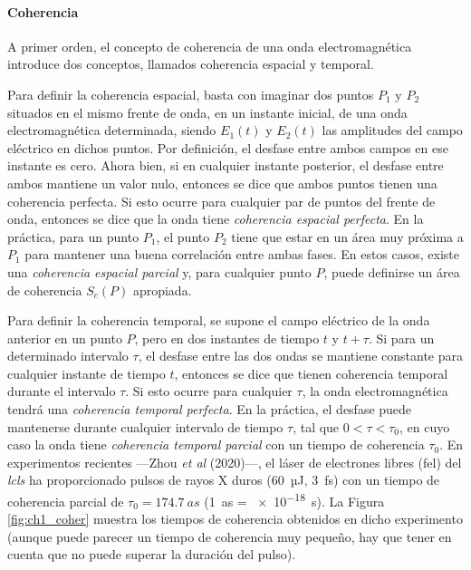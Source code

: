 \paragraph{Coherencia}\label{par:1.1.2.2}
A primer orden, el concepto de coherencia de una onda electromagnética introduce dos conceptos, llamados coherencia espacial y temporal\autocite{Svelto2010}.

Para definir la coherencia espacial, basta con imaginar dos puntos $P_1$ y $P_2$ situados en el mismo frente de onda, en un instante inicial, de una onda electromagnética determinada, siendo $E_1(t)$ y $E_2(t)$ las amplitudes del campo eléctrico en dichos puntos. Por definición, el desfase entre ambos campos en ese instante es cero. Ahora bien, si en cualquier instante posterior, el desfase entre ambos mantiene un valor nulo, entonces se dice que ambos puntos tienen una coherencia perfecta. Si esto ocurre para cualquier par de puntos del frente de onda, entonces se dice que la onda tiene \emph{coherencia espacial perfecta}. En la práctica, para un punto $P_1$, el punto $P_2$ tiene que estar en un área muy próxima a $P_1$ para mantener una buena correlación entre ambas fases. En estos casos, existe una \emph{coherencia espacial parcial} y, para cualquier punto $P$, puede definirse un área de coherencia $S_{c}(P)$ apropiada.

Para definir la coherencia temporal, se supone el campo eléctrico de la onda anterior en un punto $P$, pero en dos instantes de tiempo $t$ y $t+\tau$. Si para un determinado intervalo $\tau$, el desfase entre las dos ondas se mantiene constante para cualquier instante de tiempo $t$, entonces se dice que tienen coherencia temporal durante el intervalo $\tau$. Si esto ocurre para cualquier $\tau$, la onda electromagnética tendrá una \emph{coherencia temporal perfecta}. En la práctica, el desfase puede mantenerse durante cualquier intervalo de tiempo $\tau$, tal que $0<\tau<\tau_0$, en cuyo caso la onda tiene \emph{coherencia temporal parcial} con un tiempo de coherencia $\tau_0$. En experimentos recientes ---Zhou \emph{et al} (2020)---\autocite{Zhou2020}, el láser de electrones libres (\acrshort{fel}) del \emph{\acrfull{lcls}} ha proporcionado pulsos de rayos X duros (\qty{60}{µJ}, \qty{3}{fs}) con un tiempo de coherencia parcial de $\tau_0 = \qty{174,7}{as}$ (\qty{1}{as} = \qty{e-18}{s}). La Figura \ref{fig:ch1_coher} muestra los tiempos de coherencia obtenidos en dicho experimento (aunque puede parecer un tiempo de coherencia muy pequeño, hay que tener en cuenta que no puede superar la duración del pulso). 

